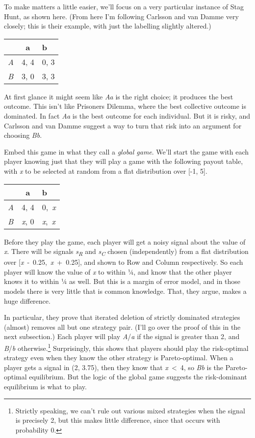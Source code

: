 \documentclass[
  11pt,
]{book}
\begin{document}
To make matters a little easier, we'll focus on a very particular instance of Stag Hunt, as shown here. (From here I'm following Carlsson and van Damme very closely; this is their example, with just the labelling slightly altered.)

\begin{longtable}[]{@{}lcl@{}}
\toprule\noalign{}
& a & b \\
\midrule\noalign{}
\endhead
\bottomrule\noalign{}
\endlastfoot
\emph{A} & 4, 4 & 0, 3 \\
\emph{B} & 3, 0 & 3, 3 \\
\end{longtable}

At first glance it might seem like \emph{Aa} is the right choice; it produces the best outcome. This isn't like Prisoners Dilemma, where the best collective outcome is dominated. In fact \emph{Aa} is the best outcome for each individual. But it is risky, and Carlsson and van Damme suggest a way to turn that risk into an argument for choosing \emph{Bb}.

Embed this game in what they call a \emph{global game}. We'll start the game with each player knowing just that they will play a game with the following payout table, with \emph{x} to be selected at random from a flat distribution over {[}-1, 5{]}.

\begin{longtable}[]{@{}lcl@{}}
\toprule\noalign{}
& a & b \\
\midrule\noalign{}
\endhead
\bottomrule\noalign{}
\endlastfoot
\emph{A} & 4, 4 & 0,~\emph{x} \\
\emph{B} & \emph{x}, 0 & \emph{x},~\emph{x} \\
\end{longtable}

Before they play the game, each player will get a noisy signal about the value of \emph{x}. There will be signals \emph{s\textsubscript{R}} and \emph{s\textsubscript{C}} chosen (independently) from a flat distribution over {[}\emph{x}~-~0.25,~\emph{x}~+~0.25{]}, and shown to Row and Column respectively. So each player will know the value of \emph{x} to within ¼, and know that the other player knows it to within ¼ as well. But this is a margin of error model, and in those models there is very little that is common knowledge. That, they argue, makes a huge difference.

In particular, they prove that iterated deletion of strictly dominated strategies (almost) removes all but one strategy pair. (I'll go over the proof of this in the next subsection.) Each player will play \emph{A}/\emph{a} if the signal is greater than 2, and \emph{B}/\emph{b} otherwise.\footnote{Strictly speaking, we can't rule out various mixed strategies when the signal is precisely 2, but this makes little difference, since that occurs with probability 0.} Surprisingly, this shows that players should play the risk-optimal strategy even when they know the other strategy is Pareto-optimal. When a player gets a signal in (2, 3.75), then they know that \emph{x}~\textless~4, so \emph{Bb} is the Pareto-optimal equilibrium. But the logic of the global game suggests the risk-dominant equilibrium is what to play.
\end{document}
